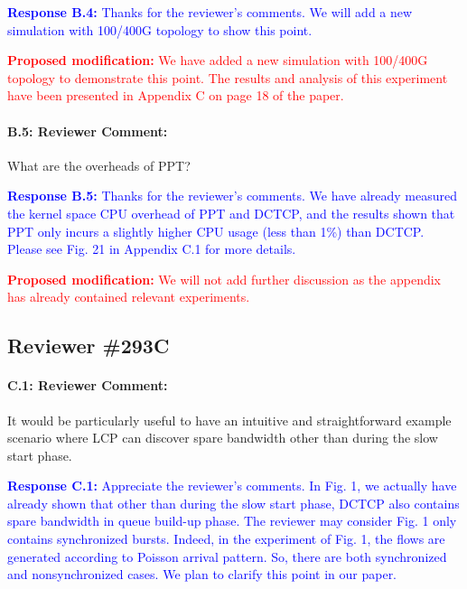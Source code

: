 \documentclass[12pt,one-column]{article}
\begin{document}
\noindent\textcolor{blue}{\textbf{Response B.4:}
Thanks for the reviewer’s comments. 
We will add a new simulation with 100/400G topology to show this point.
}

\noindent\textcolor{red}{\textbf{Proposed modification: }
We have added a new simulation with 100/400G topology to demonstrate this point. The results and analysis of this experiment have been presented in Appendix C on page 18 of the paper.
}


{\it \paragraph{B.5: Reviewer Comment:} What are the overheads of PPT?}

\noindent\textcolor{blue}{\textbf{Response B.5:}
Thanks for the reviewer’s comments. 
We have already measured the kernel space CPU overhead of PPT and DCTCP, and the results shown that PPT only incurs a slightly higher CPU usage (less than 1\%) than DCTCP. 
Please see Fig. 21 in Appendix C.1 for more details.
}

\noindent\textcolor{red}{\textbf{Proposed modification: }
We will not add further discussion as the appendix has already contained relevant experiments.
}

\subsection{Reviewer \#293C}
{\it \paragraph{C.1: Reviewer Comment:} It would be particularly useful to have an intuitive and straightforward example scenario where LCP can discover spare bandwidth other than during the slow start phase.}

\noindent\textcolor{blue}{\textbf{Response C.1:} 
Appreciate the reviewer’s comments. 
In Fig. 1, we actually have already shown that other than during the slow start phase, DCTCP also contains spare bandwidth in queue build-up phase. The reviewer may consider Fig. 1 only contains synchronized bursts. Indeed, in the experiment of Fig. 1, the flows are generated according to Poisson arrival  pattern. So, there are both synchronized and nonsynchronized cases. We plan to clarify this point in our paper.
}
\end{document}
